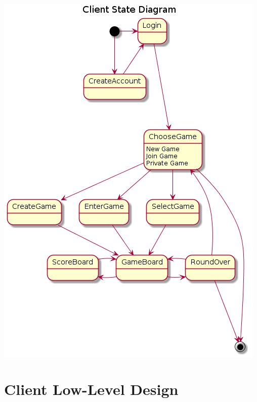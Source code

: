 \documentclass[]{scrartcl}
\begin{document}
 \centerline{\includegraphics{Client State Diagram.png}}
 \noindent{}

 \section{Client Low-Level Design }
 
\end{document}
